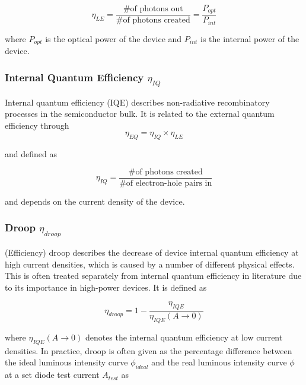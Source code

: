 \documentclass[twoside,twocolumn,9pt]{article}
\begin{document}
\begin{equation}
    \eta_{LE}=\frac{\text{\# of photons out}}{\text{\# of photons created}} = \frac{P_{opt}}{P_{int}}
\end{equation}

where $P_{opt}$ is the optical power of the device and $P_{int}$ is the internal power of the device\cite{schubert2018light}\cite{tsao2010solid}.

\subsubsection{Internal Quantum Efficiency $\eta_{IQ}$}

Internal quantum efficiency (IQE) describes non-radiative recombinatory processes in the semiconductor bulk. It is related to the external quantum efficiency through
\begin{equation}
\label{eqn:ieq-eqe}
    \eta_{EQ} = \eta_{IQ} \times \eta_{LE}
\end{equation}

and defined as

\begin{equation}
    \eta_{IQ} = \frac{\# \text{of photons created}}{\# \text{of electron-hole pairs in}}
\end{equation}

and depends on the current density of the device\cite{schubert2018light}\cite{tsao2010solid}. 

\subsubsection{Droop $\eta_{droop}$}

(Efficiency) droop describes the decrease of device internal quantum efficiency at high current densities, which is caused by a number of different physical effects\cite{David2020}. This is often treated separately from internal quantum efficiency in literature due to its importance in high-power devices. It is defined as

\begin{equation}
    \eta_{droop} = 1 - \frac{\eta_{IQE}}{\eta_{IQE}(A \rightarrow 0)}
\end{equation}

where $\eta_{IQE}(A \rightarrow 0)$ denotes the internal quantum efficiency at low current densities. In practice, droop is often given as the percentage difference between the ideal luminous intensity curve $\phi_{ideal}$ and the real luminous intensity curve $\phi$ at a set diode test current $A_{test}$ as
\end{document}

